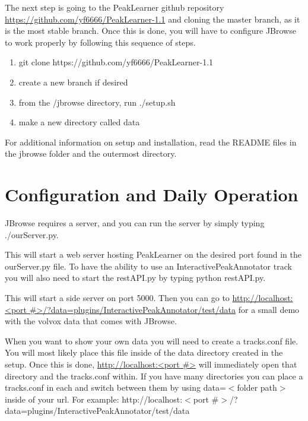 \documentclass[a4paper,12pt]{article}
\newenvironment{monospace}{\fontfamily{pcr}\selectfont}{\par}
\begin{document}
The next step is going to the PeakLearner github repository \linebreak \url{https://github.com/yf6666/PeakLearner-1.1} and cloning the master branch, as it is the most stable branch. Once this is done, you will have to configure JBrowse to work properly by following this sequence of steps.
	\begin{enumerate}
		\item \begin{monospace}git clone https://github.com/yf6666/PeakLearner-1.1\end{monospace}
		\item create a new branch if desired
		\item from the /jbrowse directory, run \begin{monospace}./setup.sh\end{monospace}
		\item make a new directory called \begin{monospace}data\end{monospace}
	\end{enumerate}


For additional information on setup and installation, read the README files in the jbrowse folder and the outermost directory.

\section{Configuration and Daily Operation}

JBrowse requires a server, and you can run the server by simply typing \begin{monospace}./ourServer.py.\end{monospace}This will start a web server hosting PeakLearner on the desired port found in the ourServer.py file. To have the ability to use an InteractivePeakAnnotator track you will also need to start the restAPI.py by typing \begin{monospace}python restAPI.py.\end{monospace}This will start a side server on port 5000. Then you can go to \url{http://localhost:<port #>/?data=plugins/InteractivePeakAnnotator/test/data} for a small demo with the volvox data that comes with JBrowse. \par

When you want to show your own data you will need to create a tracks.conf file. You will most likely place this file inside of the data directory created in the setup. Once this is done, \url{http://localhost:<port #>} will immediately open that directory and the tracks.conf within. If you have many directories you can place a tracks.conf in each and switch between them by using data=$<$folder path$>$ inside of your url. For example: http://localhost:\linebreak$<$port \#$>$/?data=plugins/InteractivePeakAnnotator/test/data
\end{document}

